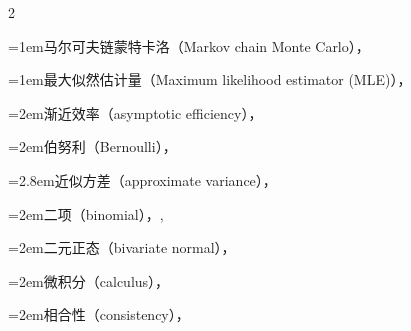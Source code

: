 \begin{multicols}{2}
\par\addvspace{2pt}
\par\noindent\hangindent=1em\hspace*{0em}\label{idx:666}马尔可夫链蒙特卡洛（Markov chain Monte Carlo），\hyperref[sec:5.8.5]{\pageref*{sec:5.8.5}}\par
\par\addvspace{2pt}
\par\noindent\hangindent=1em\hspace*{0em}\label{idx:667}最大似然估计量（Maximum likelihood estimator (MLE)），\hyperref[def:7.2.4]{\pageref*{def:7.2.4}}\par
\par\noindent\hangindent=2em\hspace*{1em}\label{idx:668}渐近效率（asymptotic efficiency），\hyperref[thm:10.1.12]{\pageref*{thm:10.1.12}}\par
\par\noindent\hangindent=2em\hspace*{1em}\label{idx:669}伯努利（Bernoulli），\hyperref[ex:7.2.7]{\pageref*{ex:7.2.7}}\par
\par\noindent\hangindent=2.8em\hspace*{1.8em}\label{idx:670}近似方差（approximate variance），\hyperref[ex:10.1.14]{\pageref*{ex:10.1.14}}\par
\par\noindent\hangindent=2em\hspace*{1em}\label{idx:671}二项（binomial），\hyperref[ex:7.2.9]{\pageref*{ex:7.2.9}}, \hyperref[ex:7.2.13]{\pageref*{ex:7.2.13}}\par
\par\noindent\hangindent=2em\hspace*{1em}\label{idx:672}二元正态（bivariate normal），\hyperref[exercise:7.18]{\pageref*{exercise:7.18}}\par
\par\noindent\hangindent=2em\hspace*{1em}\label{idx:673}微积分（calculus），\hyperref[ex:7.2.12]{\pageref*{ex:7.2.12}}\par
\par\noindent\hangindent=2em\hspace*{1em}\label{idx:674}相合性（consistency），\hyperref[thm:10.1.6]{\pageref*{thm:10.1.6}}\par

\end{multicols}
